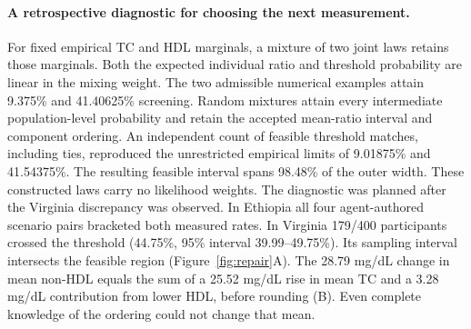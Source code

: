 \paragraph{A retrospective diagnostic for choosing the next measurement.}
For fixed empirical TC and HDL marginals, a mixture of two joint laws retains those marginals. Both the expected individual ratio and threshold probability are linear in the mixing weight. The two admissible numerical examples attain 9.375\% and 41.40625\% screening. Random mixtures attain every intermediate population-level probability and retain the accepted mean-ratio interval and component ordering. An independent count of feasible threshold matches, including ties, reproduced the unrestricted empirical limits of 9.01875\% and 41.54375\%. The resulting feasible interval spans 98.48\% of the outer width. These constructed laws carry no likelihood weights. The diagnostic was planned after the Virginia discrepancy was observed. In Ethiopia all four agent-authored scenario pairs bracketed both measured rates. In Virginia 179/400 participants crossed the threshold (44.75\%, 95\% interval 39.99--49.75\%). Its sampling interval intersects the feasible region (Figure~\ref{fig:repair}A). The 28.79 mg/dL change in mean non-HDL equals the sum of a 25.52 mg/dL rise in mean TC and a 3.28 mg/dL contribution from lower HDL, before rounding (B). Even complete knowledge of the ordering could not change that mean.
